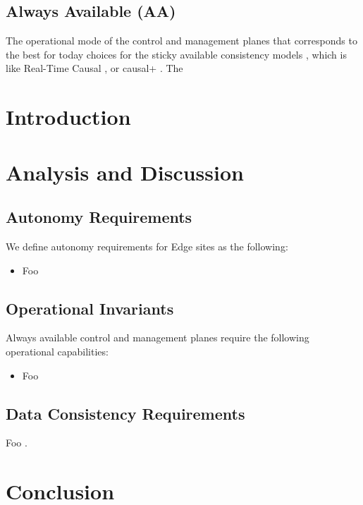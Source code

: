 \documentclass[conference]{IEEEtran}
\begin{document}
\subsection{Always Available (AA)}

The operational mode of the control and management planes that corresponds to
the best for today choices for the sticky available consistency models
\cite{b4}, which is like Real-Time Causal \cite{b2}, or causal+ \cite{b1}.
The

\section{Introduction}

\section{Analysis and Discussion}

\subsection{Autonomy Requirements}

We define autonomy requirements for Edge sites as the following:

\begin{itemize}
\item Foo
\end{itemize}

\subsection{Operational Invariants}

Always available control and management planes require the following
operational capabilities:

\begin{itemize}
\item Foo
\end{itemize}

\subsection{Data Consistency Requirements}

Foo \cite{b2}.

\section{Conclusion}
\end{document}
